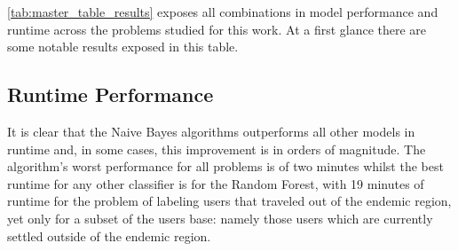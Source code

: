 %
%

\cref{tab:master_table_results} exposes all combinations in model performance and runtime across the problems studied for this work.
At a first glance there are some notable results exposed in this table.

\subsection{Runtime Performance}\label{subsec:master_table_runtime}

It is clear that the Naive Bayes algorithms outperforms all other models in runtime and, in some cases, this improvement is in orders of magnitude.
The algorithm's worst performance for all problems is of two minutes whilst the best runtime for any other classifier is for the Random Forest, with 19 minutes of runtime for the problem of labeling users that traveled out of the endemic region, yet only for a subset of the users base: namely those users which are currently settled outside of the endemic region.

